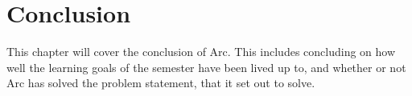 \chapter{Conclusion}\label{cha:conclusion}
This chapter will cover the conclusion of Arc. This includes concluding on how well the learning goals of the semester have been lived up to, and whether or not Arc has solved the problem statement, that it set out to solve.













